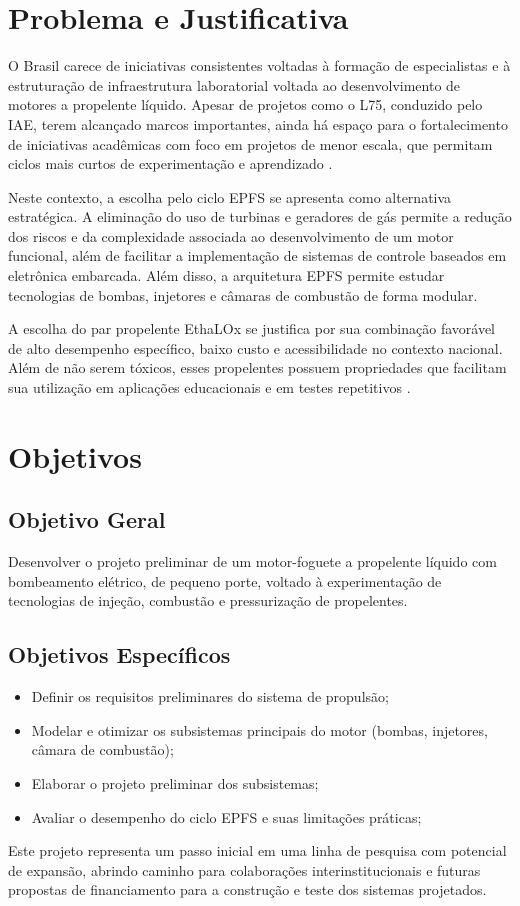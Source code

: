 \section{Problema e Justificativa}

O Brasil carece de iniciativas consistentes voltadas à formação de especialistas e à estruturação de infraestrutura laboratorial voltada ao desenvolvimento de motores a propelente líquido. Apesar de projetos como o L75, conduzido pelo \Gls{IAE}, terem alcançado marcos importantes, ainda há espaço para o fortalecimento de iniciativas acadêmicas com foco em projetos de menor escala, que permitam ciclos mais curtos de experimentação e aprendizado \cite{DevL75}.

Neste contexto, a escolha pelo ciclo \Gls{EPFS} se apresenta como alternativa estratégica. A eliminação do uso de turbinas e geradores de gás permite a redução dos riscos e da complexidade associada ao desenvolvimento de um motor funcional, além de facilitar a implementação de sistemas de controle baseados em eletrônica embarcada. Além disso, a arquitetura \Gls{EPFS} permite estudar tecnologias de bombas, injetores e câmaras de combustão de forma modular.

A escolha do par propelente \Gls{EthaLOx} se justifica por sua combinação favorável de alto desempenho específico, baixo custo e acessibilidade no contexto nacional. Além de não serem tóxicos, esses propelentes possuem propriedades que facilitam sua utilização em aplicações educacionais e em testes repetitivos \cite{DevL75}.

\section{Objetivos}

\subsection{Objetivo Geral}

Desenvolver o projeto preliminar de um motor-foguete a propelente líquido com bombeamento elétrico, de pequeno porte, voltado à experimentação de tecnologias de injeção, combustão e pressurização de propelentes.

\subsection{Objetivos Específicos}

\begin{itemize}

\item Definir os requisitos preliminares do sistema de propulsão;

\item Modelar e otimizar os subsistemas principais do motor (bombas, injetores, câmara de combustão); \item Elaborar o projeto preliminar dos subsistemas;

\item Avaliar o desempenho do ciclo \Gls{EPFS} e suas limitações práticas;

\end{itemize}

Este projeto representa um passo inicial em uma linha de pesquisa com potencial de expansão, abrindo caminho para colaborações interinstitucionais e futuras propostas de financiamento para a construção e teste dos sistemas projetados.